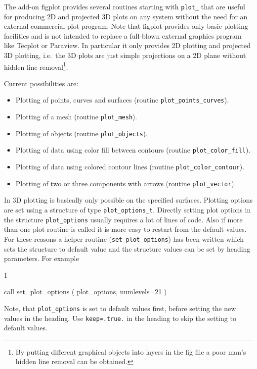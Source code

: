 The add-on figplot provides several routines starting with \texttt{plot\_} that
are useful for producing 2D and projected 3D plots on any system
without the need for an external commercial plot program.
Note that figplot provides only basic plotting facilities
and is not intended to replace a full-blown external graphics program like
Tecplot or Paraview. In particular it only provides 2D plotting and projected 3D
plotting, i.e.\ the 3D plots are just simple projections on a 2D plane without
hidden line removal\footnote{By putting different graphical objects into
layers in the fig file a poor man's hidden line removal can be obtained.}.

Current possibilities are:
\begin{itemize}
   \item Plotting of points, curves and surfaces
        (routine \texttt{plot\_points\_curves}).
   \item Plotting of a mesh (routine \texttt{plot\_mesh}).
   \item Plotting of objects (routine \texttt{plot\_objects}).
   \item Plotting of data using color fill between contours (routine
         \texttt{plot\_color\_fill}).
   \item Plotting of data using colored contour lines (routine
         \texttt{plot\_color\_contour}).
   \item Plotting of two or three components with arrows (routine
         \texttt{plot\_vector}).
\end{itemize}
In 3D plotting is basically only possible on the specified surfaces.
Plotting options are set using a structure of type \texttt{plot\_options\_t}.
Directly setting plot options in the structure
\texttt{plot\_options} usually requires
a lot of lines of code. Also if more than one plot routine is called
it is more easy to restart from the default values.
For these reasons a helper routine (\texttt{set\_plot\_options}) has been
written which sets the structure to default value and the structure values can
be set by heading parameters. For example
\begin{listing}{1}

  call set_plot_options ( plot_options, numlevels=21 )

\end{listing}
Note, that \texttt{plot\_options} is set to default values first, before setting
the new values in the heading. Use \texttt{keep=.true.} in the heading to skip
the setting to default values.

